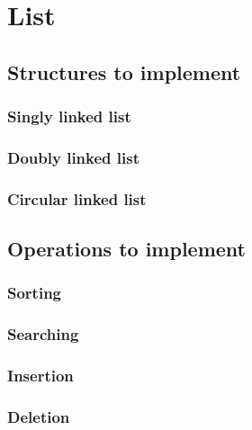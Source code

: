 \section{List}


\subsection{Structures to implement}

\subsubsection{Singly linked list}

\subsubsection{Doubly linked list}

\subsubsection{Circular linked list}

\subsection{Operations to implement}

\subsubsection{Sorting}

\subsubsection{Searching}

\subsubsection{Insertion}

\subsubsection{Deletion}

\newpage